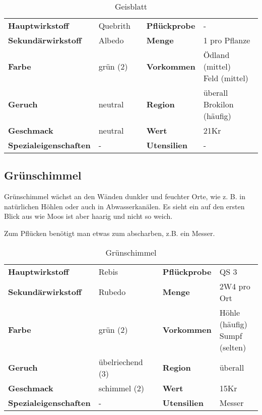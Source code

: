 \begin{table}[H] 
\begin{center} 
\begin{tabular}{|l|l|p{1cm}|l|l|} 
  	\cline{1-2} \cline{4-5} 
  	\textbf{Hauptwirkstoff} & Quebrith && \textbf{Pflückprobe} & - \\ \cline{1-2} \cline{4-5} 
  	\textbf{Sekundärwirkstoff} & Albedo && \textbf{Menge} & 1 pro Pflanze \\ \cline{1-2} \cline{4-5} 
  	\textbf{Farbe} & grün (2) && \textbf{Vorkommen} & \brcell{Ödland (mittel) \\ Feld (mittel)} \\ \cline{1-2} \cline{4-5} 
  	\textbf{Geruch} & neutral && \textbf{Region} & \brcell{überall \\ Brokilon (häufig)} \\ \cline{1-2} \cline{4-5} 
  	\textbf{Geschmack} & neutral && \textbf{Wert} & 21Kr \\ \cline{1-2} \cline{4-5} 
  	\textbf{Spezialeigenschaften} & - && \textbf{Utensilien} & - \\ \cline{1-2} \cline{4-5} 
\end{tabular} 
\end{center} 
\caption{Geisblatt} 
\label{tab:geisblatt} 
\end{table}


\subsection{Grünschimmel}
Grünschimmel wächst an den Wänden dunkler und feuchter Orte, wie z. B. in natürlichen Höhlen oder auch in Abwasserkanälen. Es sieht ein auf den ersten Blick aus wie Moos ist aber haarig und nicht so weich.

Zum Pflücken benötigt man etwas zum abscharben, z.B. ein Messer.

\begin{table}[H] 
\begin{center} 
\begin{tabular}{|l|l|p{1cm}|l|l|} 
  	\cline{1-2} \cline{4-5} 
  	\textbf{Hauptwirkstoff} & Rebis && \textbf{Pflückprobe} & QS 3 \\ \cline{1-2} \cline{4-5} 
  	\textbf{Sekundärwirkstoff} & Rubedo && \textbf{Menge} & 2W4 pro Ort \\ \cline{1-2} \cline{4-5} 
  	\textbf{Farbe} & grün (2) && \textbf{Vorkommen} & \brcell{Höhle (häufig) \\ Sumpf (selten)} \\ \cline{1-2} \cline{4-5} 
  	\textbf{Geruch} & übelriechend (3) && \textbf{Region} & überall \\ \cline{1-2} \cline{4-5} 
  	\textbf{Geschmack} & schimmel (2) && \textbf{Wert} & 15Kr \\ \cline{1-2} \cline{4-5} 
  	\textbf{Spezialeigenschaften} & - && \textbf{Utensilien} & Messer \\ \cline{1-2} \cline{4-5} 
\end{tabular} 
\end{center} 
\caption{Grünschimmel} 
\label{tab:gruenschimmel} 
\end{table}


